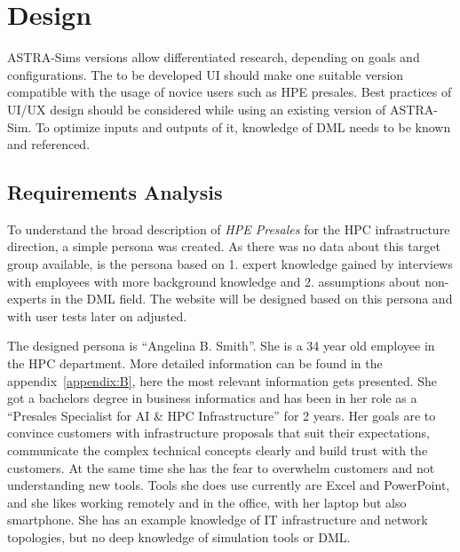 \chapter{Design} %
\label{chap:design}


ASTRA-Sims versions allow differentiated research, depending on goals and configurations.
The to be developed \ac{UI} should make one suitable version compatible with the usage of novice users such as \ac{HPE} presales.
Best practices of \ac{UI}/\ac{UX} design should be considered while using an existing version of \ac{ASTRA-Sim}. To optimize inputs and outputs of it, knowledge of \ac{DML} needs to be known and referenced.



\section{Requirements Analysis}

To understand the broad description of \textit{\ac{HPE} Presales} for the \ac{HPC} infrastructure direction, a simple persona was created. 
As there was no data about this target group available, is the persona based on 1. expert knowledge gained by interviews with employees with more background knowledge and 2. assumptions about non-experts in the \ac{DML} field. 
The website will be designed based on this persona and with user tests later on adjusted.

The designed persona is ``Angelina B. Smith''. She is a 34 year old employee in the \ac{HPC} department.
More detailed information can be found in the appendix~\ref{appendix:B}, here the most relevant information gets presented.
She got a bachelors degree in business informatics and has been in her role as a ``Presales Specialist for AI & HPC Infrastructure'' for 2 years.
Her goals are to convince customers with infrastructure proposals that suit their expectations, communicate the complex technical concepts clearly and build trust with the customers. At the same time she has the fear to overwhelm customers and not understanding new tools. Tools she does use currently are Excel and PowerPoint, and she likes working remotely and in the office, with her laptop but also smartphone.
She has an example knowledge of \ac{IT} infrastructure and network topologies, but no deep knowledge of simulation tools or \ac{DML}.


